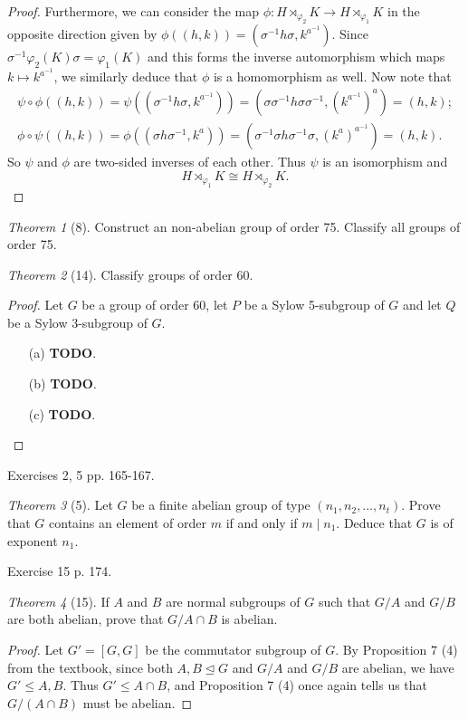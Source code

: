 \documentclass[12pt]{article}
\theoremstyle{remark}
\theoremstyle{named}
\newtheorem*{theorem}{Theorem}
\newcommand{\normal}{\trianglelefteq}
\begin{document}
\begin{proof}
    Furthermore, we can consider the map \(\phi : H \rtimes_{\varphi_2} K \to H \rtimes_{\varphi_1} K\) in the opposite direction given by \(\phi((h, k)) = (\sigma^{-1}h\sigma, k^{a^{-1}})\). Since \(\sigma^{-1}\varphi_2(K)\sigma = \varphi_1(K)\) and this forms the inverse automorphism which maps \(k \mapsto k^{a^{-1}}\), we similarly deduce that \(\phi\) is a homomorphism as well. Now note that 
    \begin{align*}
        \psi \circ \phi ((h, k)) = \psi((\sigma^{-1}h\sigma, k^{a^{-1}})) = (\sigma\sigma^{-1}h\sigma\sigma^{-1}, (k^{a^{-1}})^a) = (h, k); \\
        \phi \circ \psi ((h, k)) = \phi((\sigma h\sigma^{-1}, k^{a})) = (\sigma^{-1}\sigma h\sigma^{-1}\sigma, (k^{a})^{a^{-1}}) = (h, k).
    \end{align*}
    So \(\psi\) and \(\phi\) are two-sided inverses of each other. Thus \(\psi\) is an isomorphism and 
    \[H \rtimes_{\varphi_1} K \cong H \rtimes_{\varphi_2} K.\]
\end{proof}

\begin{theorem}[8]
    Construct an non-abelian group of order 75. Classify all groups of order 75. 
\end{theorem}

\begin{theorem}[14]
    Classify groups of order 60.
\end{theorem}

\begin{proof}
    Let \(G\) be a group of order 60, let \(P\) be a Sylow 5-subgroup of \(G\) and let \(Q\) be a Sylow 3-subgroup of \(G\).
    \begin{enumerate}
        \item[(a)] \textbf{TODO}.
        \item[(b)] \textbf{TODO}.
        \item[(c)] \textbf{TODO}.
    \end{enumerate}
\end{proof}

Exercises 2, 5 pp. 165-167.

\begin{theorem}[5]
    Let \(G\) be a finite abelian group of type \((n_1, n_2, \dots, n_t)\). Prove that \(G\) contains an element of order \(m\) if and only if \(m \mid n_1\). Deduce that \(G\) is of exponent \(n_1\).
\end{theorem}

Exercise 15 p. 174.

\begin{theorem}[15]
    If \(A\) and \(B\) are normal subgroups of \(G\) such that \(G / A\) and \(G / B\) are both abelian, prove that \(G / A \cap B\) is abelian.
\end{theorem}

\begin{proof}
    Let \(G' = [G, G]\) be the commutator subgroup of \(G\). By Proposition 7 (4) from the textbook, since both \(A, B \normal G\) and \(G / A\) and \(G / B\) are abelian, we have \(G' \le A, B\). Thus \(G' \le A \cap B\), and Proposition 7 (4) once again tells us that \(G / (A \cap B)\) must be abelian.
\end{proof}
\end{document}
